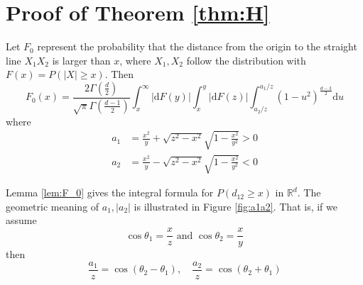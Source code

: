 \documentclass{aptpub}
\def\R{\mathbb{R}}
\def\d{\mathrm{d}}
\begin{document}
\section{Proof of Theorem \ref{thm:H}}\label{app:th}
\begin{lemma}\label{lem:F_0}
     Let $F_0$ represent the
probability that the distance from the origin to the straight line
$X_1X_2$ is larger than $x$, where $X_1, X_2$ follow the distribution with $F(x)=P(|X|\geq x)$.
Then 
\begin{equation}\label{eq:F_0_expression}
     F_0(x)=\frac{2\Gamma(\frac{d}{2})}
     {\sqrt{\pi}\Gamma(\frac{d-1}{2})}
     \int_x^{\infty} |\d F(y)|
     \int_x^{y} |\d F(z)| \int_{a_2/z}^{a_1 /z} (1-u^2)^{\frac{d-3}{2}} \d u
 \end{equation}
where
\begin{align}
     a_1 & =\frac{x^2}{y}+\sqrt{z^2-x^2}\sqrt{1-\frac{x^2}{y^2}} > 0
     \label{eq:a_1} \\
a_2 & =\frac{x^2}{y}-\sqrt{z^2-x^2}\sqrt{1-\frac{x^2}{y^2}} < 0
\label{eq:a_2}
\end{align}
\end{lemma}
Lemma \ref{lem:F_0} gives the integral formula for $P(d_{12}\geq x)$ in $\R^d$.
The geometric meaning of $a_1, |a_2|$ is illustrated in Figure
\ref{fig:a1a2}. That is, if we assume
\begin{equation}\label{eq:theta_1_theta_2}
     \cos\theta_1=\frac{x}{z}
     \textrm{ and } \cos\theta_2=\frac{x}{y} 
\end{equation}
then
\begin{equation}\label{eq:a_1_a_2}
     \frac{a_1}{z} = \cos(\theta_2 - \theta_1),
     \quad
     \frac{a_2}{z} = \cos(\theta_2+\theta_1)           
\end{equation}
\end{document}
